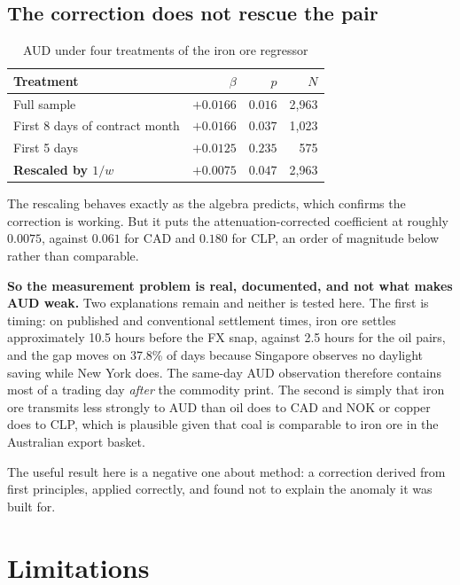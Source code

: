 \documentclass[11pt,a4paper]{article}
\begin{document}
\subsection{The correction does not rescue the pair}

\begin{table}[htbp]
\centering
\caption{AUD under four treatments of the iron ore regressor}
\begin{tabular}{lrrr}
\toprule
Treatment & $\beta$ & $p$ & $N$ \\
\midrule
Full sample                      & $+0.0166$ & $0.016$ & 2{,}963 \\
First 8 days of contract month   & $+0.0166$ & $0.037$ & 1{,}023 \\
First 5 days                     & $+0.0125$ & $0.235$ & 575 \\
\textbf{Rescaled by $1/w$}       & $\mathbf{+0.0075}$ & $0.047$ & 2{,}963 \\
\bottomrule
\end{tabular}
\end{table}

The rescaling behaves exactly as the algebra predicts, which confirms the
correction is working. But it puts the attenuation-corrected coefficient at
roughly $0.0075$, against $0.061$ for CAD and $0.180$ for CLP, an order of
magnitude below rather than comparable.

\textbf{So the measurement problem is real, documented, and not what makes AUD
weak.} Two explanations remain and neither is tested here. The first is timing:
on published and conventional settlement times, iron ore settles approximately
10.5 hours before the FX snap, against 2.5 hours for the oil pairs, and the gap moves on 37.8\% of days because Singapore
observes no daylight saving while New York does. The same-day AUD observation
therefore contains most of a trading day \emph{after} the commodity print. The
second is simply that iron ore transmits less strongly to AUD than oil does to
CAD and NOK or copper does to CLP, which is plausible given that coal is
comparable to iron ore in the Australian export basket.

The useful result here is a negative one about method: a correction derived from
first principles, applied correctly, and found not to explain the anomaly it was
built for.

\section{Limitations}
\end{document}

